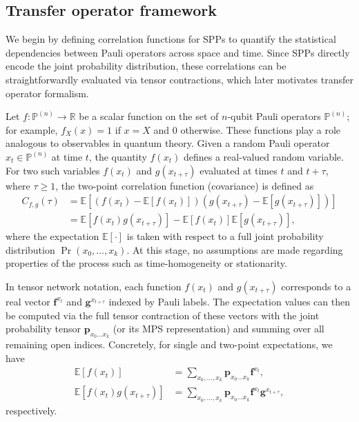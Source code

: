 \documentclass[
    aps,
    prx,
    reprint,
    superscriptaddress,
    longbibliography,
    nofootinbib,
    floatfix,
]{revtex4-2}
\begin{document}
\subsection{Transfer operator framework}\label{sec:correlation-functions}
We begin by defining correlation functions for SPPs to quantify the statistical dependencies between Pauli operators across space and time. Since SPPs directly encode the joint probability distribution, these correlations can be straightforwardly evaluated via tensor contractions, which later motivates transfer operator formalism.

Let \(f : \mathbb{P}^{(n)} \to \mathbb{R}\) be a scalar function on the set of \(n\)-qubit Pauli operators \(\mathbb{P}^{(n)}\); for example, \(f_X(x) = 1\) if \(x=X\) and 0 otherwise. These functions play a role analogous to observables in quantum theory. Given a random Pauli operator \(x_t \in \mathbb{P}^{(n)}\) at time \(t\), the quantity \(f(x_t)\) defines a real-valued random variable. For two such variables \(f(x_t)\) and \(g(x_{t+\tau})\) evaluated at times \(t\) and \(t+\tau\), where \(\tau \geq 1\), the two-point correlation function (covariance) is defined as 
\begin{equation}
    \begin{split}
        C_{f,g}(\tau) 
        &= \mathbb{E}[(f(x_t) - \mathbb{E}[f(x_t)])(g(x_{t+\tau}) - \mathbb{E}[g(x_{t+\tau})])] \\
        &= \mathbb{E}[f(x_t) g(x_{t+\tau})] - \mathbb{E}[f(x_t)] \mathbb{E}[g(x_{t+\tau})],
    \end{split}
\end{equation}
where the expectation \(\mathbb{E}[\cdot]\) is taken with respect to a full joint probability distribution \(\Pr{(x_0,\dots,x_k)}\). At this stage, no assumptions are made regarding properties of the process such as time-homogeneity or stationarity.

In tensor network notation, each function \(f(x_t)\) and \(g(x_{t+\tau})\) corresponds to a real vector \(\mathbf{f}^{x_t}\) and \(\mathbf{g}^{x_{t+\tau}}\) indexed by Pauli labels. The expectation values can then be computed via the full tensor contraction of these vectors with the joint probability tensor \(\mathbf{p}_{x_0\dots x_k}\) (or its MPS representation) and summing over all remaining open indices. Concretely, for single and two-point expectations, we have
\begin{equation}
    \begin{aligned}
        \mathbb{E}[f(x_t)]
        &= \sum_{x_0,\dots,x_k} \mathbf{p}_{x_0\dots x_k} 
        \mathbf{f}^{x_t}, \\
        \mathbb{E}[f(x_t) g(x_{t+\tau})] 
        &= \sum_{x_0,\dots,x_k} \mathbf{p}_{x_0\dots x_k} 
        \mathbf{f}^{x_t} \mathbf{g}^{x_{t+\tau}},
    \end{aligned}
\end{equation}
respectively.
\end{document}
